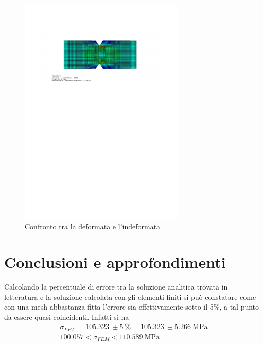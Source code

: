 \begin{figure}[htb]
    \centering
    \includegraphics[width=0.7\textwidth]{rel2/img2/DeformataIndeformata.pdf}
    \caption{Confronto tra la deformata e l'indeformata}
    \label{fig:DeformataIndeformata}
\end{figure}
\section{Conclusioni e approfondimenti}
Calcolando la percentuale di errore tra la soluzione analitica trovata in letteratura e la soluzione calcolata con gli elementi finiti si può constatare come con una mesh abbastanza fitta l’errore sia effettivamente sotto il 5\%, a tal punto da essere quasi coincidenti.
Infatti si ha
\begin{gather*}
    \sigma_{LET.} = \SI{105.323}{} \pm \SI{5}{\%} = \SI{105.323}{} \pm \SI{5.266}{\mega\pascal} \\
    100.057 < \sigma_{FEM} < \SI{110.589}{\mega\pascal}
\end{gather*}

